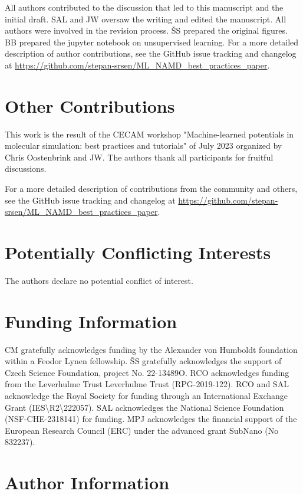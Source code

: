 \documentclass[9pt,bestpractices]{livecoms}
\newcommand{\githubrepository}{\url{https://github.com/stepan-srsen/ML_NAMD_best_practices_paper}}  %
\begin{document}
All authors contributed to the discussion that led to this manuscript and the initial draft. 
SAL and JW oversaw the writing and edited the manuscript. All authors were involved in the revision process. ŠS prepared the original figures. BB prepared the jupyter notebook on unsupervised learning.
For a more detailed description of author contributions,
see the GitHub issue tracking and changelog at \githubrepository.

\section*{Other Contributions}
%

This work is the result of the CECAM workshop "Machine-learned potentials in molecular simulation: best practices and tutorials" of July 2023 organized by Chris Oostenbrink and JW. The authors thank all participants for fruitful discussions.

For a more detailed description of contributions from the community and others, see the GitHub issue tracking and changelog at \githubrepository.

\section*{Potentially Conflicting Interests}

The authors declare no potential conflict of interest.

\section*{Funding Information}
CM gratefully acknowledges funding by the Alexander von Humboldt foundation within a Feodor Lynen fellowship. ŠS gratefully acknowledges the support of Czech Science Foundation, project No. 22-13489O. RCO acknowledges funding from the Leverhulme Trust Leverhulme Trust (RPG-2019-122). RCO and SAL acknowledge the Royal Society for funding through an International Exchange Grant (IES\textbackslash R2\textbackslash 222057). SAL acknowledges the National Science Foundation (NSF-CHE-2318141) for funding. MPJ acknowledges the financial support of the European Research Council (ERC) under the advanced grant SubNano (No 832237).

\section*{Author Information}
\makeorcid




\end{document}
